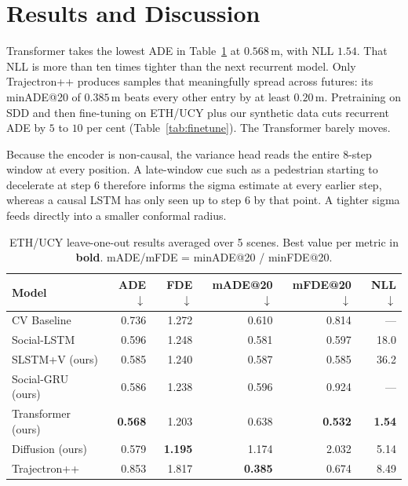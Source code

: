 \documentclass[conference]{IEEEtran}
\begin{document}
\section{Results and Discussion}

Transformer takes the lowest ADE in Table~\ref{tab:ethucy} at
$0.568$\,m, with NLL $1.54$.  That NLL is more than ten times tighter
than the next recurrent model.  Only Trajectron++ produces samples
that meaningfully spread across futures: its minADE@20 of $0.385$\,m
beats every other entry by at least $0.20$\,m.  Pretraining on SDD and
then fine-tuning on ETH/UCY plus our synthetic data cuts recurrent
ADE by $5$ to $10$ per cent (Table~\ref{tab:finetune}).  The
Transformer barely moves.

Because the encoder is non-causal, the variance head reads the entire
8-step window at every position.  A late-window cue such as a
pedestrian starting to decelerate at step 6 therefore informs the
sigma estimate at every earlier step, whereas a causal LSTM has only
seen up to step 6 by that point.  A tighter sigma feeds directly into
a smaller conformal radius.

\begin{table}[t]
\caption{ETH/UCY leave-one-out results averaged over 5 scenes.
         Best value per metric in \textbf{bold}. mADE/mFDE = minADE@20 / minFDE@20.}
\label{tab:ethucy}
\centering
\footnotesize
\setlength{\tabcolsep}{4pt}
\begin{tabular}{@{}lrrrrr@{}}
\toprule
Model
  & ADE$\downarrow$
  & FDE$\downarrow$
  & mADE@20$\downarrow$
  & mFDE@20$\downarrow$
  & NLL$\downarrow$ \\
\midrule
CV Baseline
  & 0.736 & 1.272 & 0.610 & 0.814 & --- \\
Social-LSTM~\cite{alahi2016social}
  & 0.596 & 1.248 & 0.581 & 0.597 & 18.0 \\
SLSTM+V (ours)
  & 0.585 & 1.240 & 0.587 & 0.585 & 36.2 \\
Social-GRU (ours)
  & 0.586 & 1.238 & 0.596 & 0.924 & --- \\
Transformer (ours)
  & \textbf{0.568} & 1.203 & 0.638 & \textbf{0.532} & \textbf{1.54} \\
Diffusion (ours)
  & 0.579 & \textbf{1.195} & 1.174 & 2.032 & 5.14 \\
Trajectron++~\cite{salzmann2020trajectron}
  & 0.853 & 1.817 & \textbf{0.385} & 0.674 & 8.49 \\
\bottomrule
\end{tabular}
\end{table}
\end{document}

